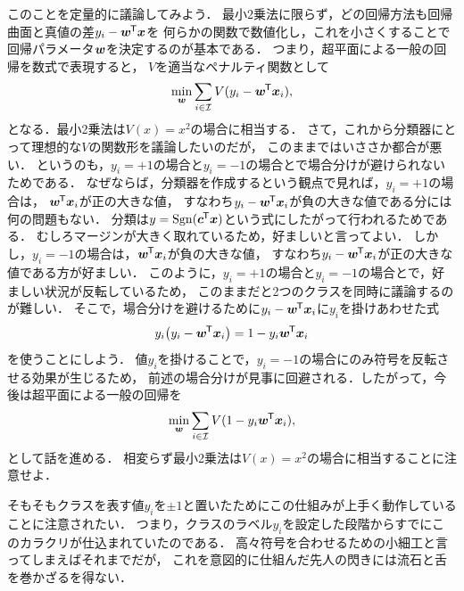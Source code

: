 このことを定量的に議論してみよう．
最小2乗法に限らず，どの回帰方法も回帰曲面と真値の差$y_i - \boldsymbol{w}^{\mkern-1.5mu\mathsf{T}}\boldsymbol{x}$を
何らかの関数で数値化し，これを小さくすることで回帰パラメータ$\boldsymbol{w}$を決定するのが基本である．
つまり，超平面による一般の回帰を数式で表現すると，
$V$を適当なペナルティ関数として
\begin{equation}
\min_{\boldsymbol{w}} \sum_{i \in \mathcal{I}}
V (y_i - \boldsymbol{w}^{\mkern-1.5mu\mathsf{T}}\boldsymbol{x}_i),
\end{equation}
となる．最小2乗法は$V(x) = x^2$の場合に相当する．
さて，これから分類器にとって理想的な$V$の関数形を議論したいのだが，
このままではいささか都合が悪い．
というのも，$y_i = +1$の場合と$y_i = -1$の場合とで場合分けが避けられないためである．
なぜならば，分類器を作成するという観点で見れば，$y_i = +1$の場合は，
$\boldsymbol{w}^{\mkern-1.5mu\mathsf{T}}\boldsymbol{x}_i$が正の大きな値，
すなわち$y_i - \boldsymbol{w}^{\mkern-1.5mu\mathsf{T}}\boldsymbol{x}_i$が負の大きな値である分には何の問題もない．
分類は$y = \operatorname*{Sgn}(\boldsymbol{c}^{\mkern-1.5mu\mathsf{T}}\boldsymbol{x})$という式にしたがって行われるためである．
むしろマージンが大きく取れているため，好ましいと言ってよい．
しかし，$y_i = -1$の場合は，$\boldsymbol{w}^{\mkern-1.5mu\mathsf{T}}\boldsymbol{x}_i$が負の大きな値，
すなわち$y_i - \boldsymbol{w}^{\mkern-1.5mu\mathsf{T}}\boldsymbol{x}_i$が正の大きな値である方が好ましい．
このように，$y_i = +1$の場合と$y_i = -1$の場合とで，好ましい状況が反転しているため，
このままだと2つのクラスを同時に議論するのが難しい．
そこで，場合分けを避けるために$y_i - \boldsymbol{w}^{\mkern-1.5mu\mathsf{T}}\boldsymbol{x}_i$に$y_i$を掛けあわせた式
\begin{equation}
y_i \bigl( y_i - \boldsymbol{w}^{\mkern-1.5mu\mathsf{T}}\boldsymbol{x}_i \bigr)
= 1 - y_i \boldsymbol{w}^{\mkern-1.5mu\mathsf{T}}\boldsymbol{x}_i
\end{equation}
を使うことにしよう．
値$y_i$を掛けることで，$y_i = -1$の場合にのみ符号を反転させる効果が生じるため，
前述の場合分けが見事に回避される．したがって，今後は超平面による一般の回帰を
\begin{equation}
\label{eqn:regression_general_2}
\min_{\boldsymbol{w}} \sum_{i \in \mathcal{I}}
V (1 - y_i\boldsymbol{w}^{\mkern-1.5mu\mathsf{T}}\boldsymbol{x}_i),
\end{equation}
として話を進める．
相変らず最小2乗法は$V(x) = x^2$の場合に相当することに注意せよ．

\begin{note}
そもそもクラスを表す値$y_i$を$\pm 1$と置いたためにこの仕組みが上手く動作していることに注意されたい．
つまり，クラスのラベル$y_i$を設定した段階からすでにこのカラクリが仕込まれていたのである．
高々符号を合わせるための小細工と言ってしまえばそれまでだが，
これを意図的に仕組んだ先人の閃きには流石と舌を巻かざるを得ない．
\end{note}

